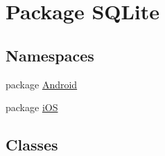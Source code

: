 \hypertarget{namespace_s_q_lite}{\section{Package S\+Q\+Lite}
\label{namespace_s_q_lite}
}
\subsection*{Namespaces}
\begin{DoxyCompactItemize}
\item 
package \hyperlink{namespace_s_q_lite_1_1_android}{Android}
\item 
package \hyperlink{namespace_s_q_lite_1_1i_o_s}{i\+O\+S}
\end{DoxyCompactItemize}
\subsection*{Classes}
